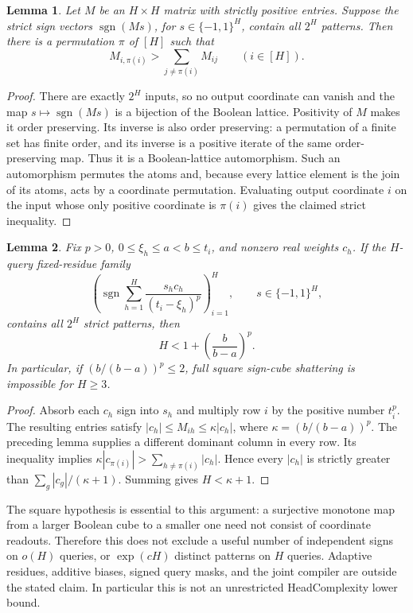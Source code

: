 \documentclass[11pt]{article}
\newtheorem{lemma}{Lemma}
\begin{document}
\begin{lemma}
Let $M$ be an $H\times H$ matrix with strictly positive entries. Suppose
the strict sign vectors $\operatorname{sgn}(Ms)$, for
$s\in\{-1,1\}^H$, contain all $2^H$ patterns. Then there is a
permutation $\pi$ of $[H]$ such that
\[
 M_{i,\pi(i)}>\sum_{j\ne\pi(i)}M_{ij}\qquad(i\in[H]).
\]
\end{lemma}
\begin{proof}
There are exactly $2^H$ inputs, so no output coordinate can vanish and
the map $s\mapsto\operatorname{sgn}(Ms)$ is a bijection of the Boolean
lattice. Positivity of $M$ makes it order preserving. Its inverse is
also order preserving: a permutation of a finite set has finite order,
and its inverse is a positive iterate of the same order-preserving map.
Thus it is a Boolean-lattice automorphism. Such an automorphism permutes
the atoms and, because every lattice element is the join of its atoms,
acts by a coordinate permutation. Evaluating output coordinate $i$ on
the input whose only positive coordinate is $\pi(i)$ gives the claimed
strict inequality.
\end{proof}

\begin{lemma}
Fix $p>0$, $0\leq\xi_h\leq a<b\leq t_i$, and nonzero real
weights $c_h$. If the $H$-query fixed-residue family
\[
 \left(\operatorname{sgn}\sum_{h=1}^H
               \frac{s_hc_h}{(t_i-\xi_h)^p}\right)_{i=1}^H,
 \qquad s\in\{-1,1\}^H,
\]
contains all $2^H$ strict patterns, then
\[
 H<1+\left(\frac{b}{b-a}\right)^p.
\]
In particular, if $(b/(b-a))^p\leq2$, full square sign-cube
shattering is impossible for $H\geq3$.
\end{lemma}
\begin{proof}
Absorb each $c_h$ sign into $s_h$ and multiply row $i$ by the positive
number $t_i^p$. The resulting entries satisfy
$|c_h|\leq M_{ih}\leq\kappa|c_h|$, where
$\kappa=(b/(b-a))^p$. The preceding lemma supplies a different dominant
column in every row. Its inequality implies
$\kappa|c_{\pi(i)}|>\sum_{h\ne\pi(i)}|c_h|$.
Hence every $|c_h|$ is strictly greater than
$\sum_g|c_g|/(\kappa+1)$. Summing gives $H<\kappa+1$.
\end{proof}

The square hypothesis is essential to this argument: a surjective
monotone map from a larger Boolean cube to a smaller one need not consist
of coordinate readouts. Therefore this does not exclude a useful
number of independent signs on $o(H)$ queries, or
$\exp(cH)$ distinct patterns on $H$ queries. Adaptive residues, additive
biases, signed query masks, and the joint compiler are outside the stated
claim. In particular this is not an unrestricted HeadComplexity lower
bound.
\end{document}
